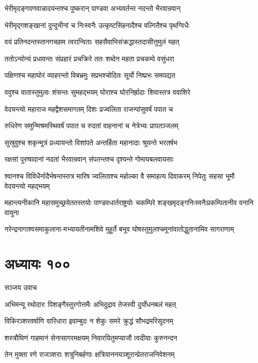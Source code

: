 \twolineshloka
{भेरीमृदङ्गपणवान्नादयन्तश्च पुष्करान्}
{पाण्डवा अभ्यवर्तन्त नदन्तो भैरवान्रवान्}


\twolineshloka
{भेरीमृद्गशङ्खानां दुन्दुभीनां च निःस्वनैः}
{उत्कृष्टसिंहनादैश्च वल्गितैश्च पृथग्विधैः}


\twolineshloka
{वयं प्रतिनदन्तस्तानगच्छाम त्वरान्विताः}
{सहसैवाभिसंक्रद्धास्तदासीत्तुमुलं महत्}


\twolineshloka
{ततोऽन्योन्यं प्रधावन्तः संप्रहारं प्रचक्रिरे}
{ततः शब्देन महता प्रचकम्पे वसुंधरा}


\twolineshloka
{पक्षिणश्च महाघोरं व्याहरन्तो विबभ्रमुः}
{सप्रभश्चोदितः सूर्यो निष्प्रभः समपद्यत}


\twolineshloka
{ववुश्च वातास्तुमुलाः शंसन्तः सुमहद्भयम्}
{घोराश्च घोरनिर्ह्रादाः शिवास्तत्र ववाशिरे}


\twolineshloka
{वेदयन्त्यो महाराज महद्वैशसमागतम्}
{दिशः प्रज्वलिता राजन्पांसुवर्षं पपात च}


\twolineshloka
{रुधिरेण समुन्मिश्रमस्थिवर्षं पपात च}
{रुदतां वाहनानां च नेत्रेभ्यः प्रापतञ्जलम्}


\twolineshloka
{सुस्रुवुश्च शकृन्मूत्रं प्रध्यायन्तो विशांपते}
{अन्तर्हिता महानादाः श्रूयन्ते भरतर्षभ}


\twolineshloka
{रक्षसां पुरुषादानां नदतां भैरवान्रवान्}
{संपतन्तश्च दृश्यन्ते गोमायबलवायसाः}


\threelineshloka
{श्वानश्च विविधैर्नादैर्भषन्तस्तत्र मारिष}
{ज्वलिताश्च महोल्का वै समाहत्य दिवाकरम्}
{निपेतुः सहसा भूमौ वेदयन्त्यो महद्भयम्}


\twolineshloka
{महान्त्यनीकानि महासमुच्छ्रयेततस्तयोः पाण्डवधार्तराष्ट्रयोः}
{चकम्पिरे शङ्खमृदङ्गनिःस्वनैःप्रकम्पितानीव वनानि वायुना}


\twolineshloka
{नरेन्द्रनागाश्वसमाकुलाना-मभ्यायतीनामशिवे मुहूर्ते}
{बभूव घोषस्तुमुलश्चमूनांवातोद्धुतानामिव सागराणाम्}


\chapter{अध्यायः १००}
\twolineshloka
{सञ्जय उवाच}
{}


\twolineshloka
{अभिमन्यू रथोदारः पिशङ्गैस्तुरगोत्तमैः}
{अभिदुद्राव तेजस्वी दुर्योधनबलं महत्}


\twolineshloka
{विकिरञ्शरवर्षाणि वारिधारा इवाम्बुदः}
{न शेकुः समरे क्रुद्धं सौभद्रमरिसूदनम्}


\twolineshloka
{शस्त्रौघिणं गाहमानं सेनासागरमक्षयम्}
{निवारयितुमप्याजौ त्वदीयाः कुरुनन्दन}


\twolineshloka
{तेन मुक्ता रणे राजञ्शराः शत्रुनिबर्हणाः}
{क्षत्रियाननयञ्शूरान्प्रेतराजनिवेशनम्}


